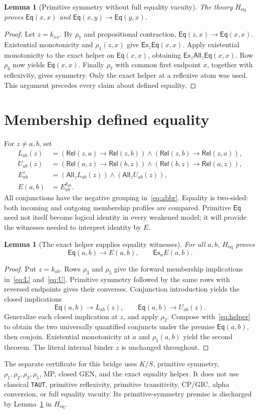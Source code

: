 \documentclass[11pt,letterpaper]{article}
\newtheorem{lemma}[theorem]{Lemma}
\theoremstyle{definition}\newtheorem{definition}[theorem]{Definition}
\theoremstyle{remark}\newtheorem{remark}[theorem]{Remark}
\newcommand{\Rel}{\mathsf{Rel}}
\newcommand{\Eq}{\mathsf{Eq}}
\newcommand{\All}{\mathsf{All}}
\newcommand{\Ex}{\mathsf{Ex}}
\newcommand{\To}{\rightarrow}
\newcommand{\Hh}{H_{\mathrm{eq}}}
\newcommand{\file}[1]{\begingroup\small\ttfamily\nolinkurl{#1}\endgroup}
\begin{document}
\begin{lemma}[Primitive symmetry without full equality vacuity]\label{lem:sym}
The theory $\Hh$ proves $\Eq(x,x)$ and $\Eq(x,y)\To\Eq(y,x)$.
\end{lemma}
\begin{proof}
Let $z=k_{xx}$. By $\rho_7$ and propositional contraction,
$\Eq(z,x)\To\Eq(x,x)$. Existential monotonicity and $\rho_1(z,x)$ give $\Ex_z\Eq(x,x)$. Apply existential monotonicity to the exact helper on $\Eq(x,x)$, obtaining $\Ex_z\All_z\Eq(x,x)$. Row $\rho_6$ now yields $\Eq(x,x)$. Finally $\rho_7$ with common first endpoint $x$, together with reflexivity, gives symmetry. Only the exact helper at a reflexive atom was used. This argument precedes every claim about defined equality.
\end{proof}

\section{Membership defined equality}\label{sec:definition}
For $z\ne a,b$, set
\begin{align}
 L_{ab}(z)&=(\Rel(z,a)\To\Rel(z,b))\wedge(\Rel(z,b)\To\Rel(z,a)),\label{eq:L}\\
 U_{ab}(z)&=(\Rel(a,z)\To\Rel(b,z))\wedge(\Rel(b,z)\To\Rel(a,z)),\label{eq:U}\\
 E_{ab}^{z}&=(\All_z L_{ab}(z))\wedge(\All_z U_{ab}(z)),\label{eq:Ez}\\
 E(a,b)&=E_{ab}^{k_{ab}}.\label{eq:E}
\end{align}
All conjunctions have the negative grouping in~\eqref{eq:abbr}. Equality is two-sided: both incoming and outgoing membership profiles are compared. Primitive $\Eq$ need not itself become logical identity in every weakened model; it will provide the witnesses needed to interpret identity by $E$.

\begin{lemma}[The exact helper supplies equality witnesses]\label{lem:eqE}
For all $a,b$, $\Hh$ proves
\[
 \Eq(a,b)\To E(a,b),\qquad \Ex_a E(a,b).
\]
\end{lemma}
\begin{proof}
Put $z=k_{ab}$. Rows $\rho_3$ and $\rho_5$ give the forward membership implications in~\eqref{eq:L} and~\eqref{eq:U}. Primitive symmetry followed by the same rows with reversed endpoints gives their converses. Conjunction introduction yields the closed implications
\[
 \Eq(a,b)\To L_{ab}(z),\qquad \Eq(a,b)\To U_{ab}(z).
\]
Generalize each closed implication at $z$, and apply $\rho_2$. Compose with~\eqref{eq:helper} to obtain the two universally quantified conjuncts under the premise $\Eq(a,b)$, then conjoin. Existential monotonicity at $a$ and $\rho_1(a,b)$ yield the second theorem. The literal internal binder $z$ is unchanged throughout.
\end{proof}
The separate certificate for this bridge uses $K/S$, primitive symmetry, $\rho_1,\rho_2,\rho_3,\rho_5$, MP, closed GEN, and the exact equality helper. It does not use classical \file{TAUT}, primitive reflexivity, primitive transitivity, CP/GIC, alpha conversion, or full equality vacuity. Its primitive-symmetry premise is discharged by Lemma~\ref{lem:sym} in $\Hh$.
\end{document}
